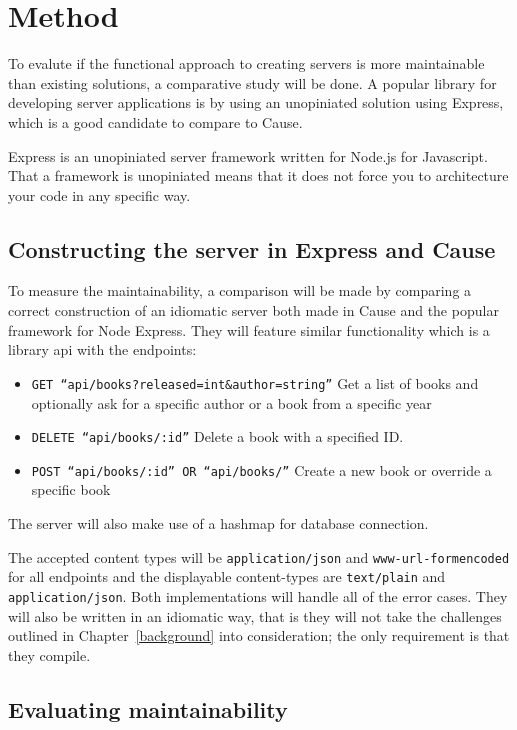 \chapter{Method}

To evalute if the functional approach to creating servers is more maintainable
than existing solutions, a comparative study will be done. A popular library for
developing server applications is by using an unopiniated solution using
Express, which is a good candidate to compare to Cause.

Express is an unopiniated server framework written for Node.js for Javascript.
That a framework is unopiniated means that it does not force you to architecture
your code in any specific way.  

\section{Constructing the server in Express and Cause}

To measure the maintainability, a comparison will be made by comparing a correct
construction of an idiomatic server both made in Cause and the popular framework
for Node Express. They will feature similar functionality which is a library api
with the endpoints:

\begin{itemize}
    \item \texttt{GET ``api/books?released=int\&author=string''} Get a list of
    books and optionally ask for a specific author or a book from a specific
    year
    \item \texttt{DELETE ``api/books/:id''} Delete a book with a specified ID.
    \item \texttt{POST ``api/books/:id'' OR ``api/books/''} Create a new book or
    override a specific book
\end{itemize}

The server will also make use of a hashmap for database connection.

The accepted content types will be \texttt{application/json} and
\texttt{www-url-formencoded} for all endpoints and the displayable content-types
are \texttt{text/plain} and \texttt{application/json}. Both implementations will handle
all of the error cases. They will also be written in an idiomatic way, that is
they will not take the challenges outlined in Chapter~\ref{background} into
consideration; the only requirement is that they compile.

\section{Evaluating maintainability}

